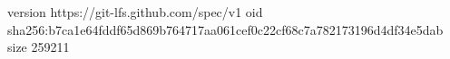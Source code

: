 version https://git-lfs.github.com/spec/v1
oid sha256:b7ca1e64fddf65d869b764717aa061cef0c22cf68c7a782173196d4df34e5dab
size 259211

